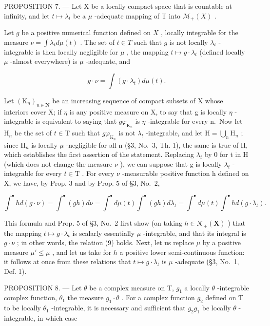 PROPOSITION 7. --- Let X be a locally compact space that is countable at infinity, and let \(t \mapsto \lambda_t\) be a \(\mu\) -adequate mapping of T into \(\mathcal{M}_+(X)\) .

Let \(g\) be a positive numerical function defined on \(X\) , locally integrable for the measure \(\nu = \int \lambda_t d\mu(t)\) . The set of \(t \in T\) such that \(g\) is not locally \(\lambda_t\) -integrable is then locally negligible for \(\mu\) , the mapping \(t \mapsto g \cdot \lambda_t\) (defined locally \(\mu\) -almost everywhere) is \(\mu\) -adequate, and

\[
g \cdot \nu = \int (g \cdot \lambda_ {t}) d \mu (t).\tag{9}
\]

Let \((\mathrm{K}_{n})_{n\in\mathbf{N}}\) be an increasing sequence of compact subsets of X whose interiors cover X; if \(\eta\) is any positive measure on X, to say that g is locally \(\eta\) -integrable is equivalent to saying that \(g\varphi_{\mathrm{K}_{n}}\) is \(\eta\) -integrable for every n.~Now let \(\mathrm{H}_{n}\) be the set of \(t\in\mathrm{T}\) such that \(g\varphi_{\mathrm{K}_{n}}\) is not \(\lambda_{t}\) -integrable, and let \(\mathrm{H}=\bigcup_{n}\mathrm{H}_{n}\) ; since \(\mathrm{H}_{n}\) is locally \(\mu\) -negligible for all n (§3, No.~3, Th. 1), the same is true of H, which establishes the first assertion of the statement. Replacing \(\lambda_{t}\) by 0 for t in H (which does not change the measure \(\nu\) ), we can suppose that g is locally \(\lambda_{t}\) -integrable for every \(t\in\mathrm{T}\) . For every \(\nu\) -measurable positive function h defined on X, we have, by Prop. 3 and by Prop. 5 of §3, No.~2,

\[
\int^ {\bullet} h d (g \cdot \nu) = \int^ {\bullet} (g h) d \nu = \int^ {\bullet} d \mu (t) \int^ {\bullet} (g h) d \lambda_ {t} = \int^ {\bullet} d \mu (t) \int^ {\bullet} h d (g \cdot \lambda_ {t}).
\]

This formula and Prop. 5 of §3, No.~2 first show (on taking \(h \in \mathcal{K}_{+}(\mathbf{X})\) ) that the mapping \(t \mapsto g \cdot \lambda_{t}\) is scalarly essentially \(\mu\) -integrable, and that its integral is \(g \cdot \nu\) ; in other words, the relation (9) holds. Next, let us replace \(\mu\) by a positive measure \(\mu' \leqslant \mu\) , and let us take for \(h\) a positive lower semi-continuous function: it follows at once from these relations that \(t \mapsto g \cdot \lambda_{t}\) is \(\mu\) -adequate (§3, No.~1, Def. 1).

PROPOSITION 8. --- Let \(\theta\) be a complex measure on T, \(g_{1}\) a locally \(\theta\) -integrable complex function, \(\theta_{1}\) the measure \(g_{1} \cdot \theta\) . For a complex function \(g_{2}\) defined on T to be locally \(\theta_{1}\) -integrable, it is necessary and sufficient that \(g_{2} g_{1}\) be locally \(\theta\) -integrable, in which case

